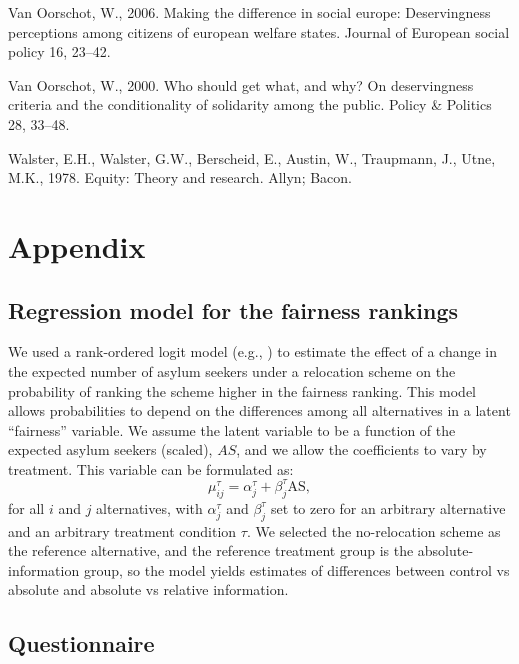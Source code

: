 \documentclass[
  12pt,
  a4paper,
]{article}
\newlength{\cslhangindent}
\newenvironment{CSLReferences}[2] %
 {\begin{list}{}{%
  \setlength{\itemindent}{0pt}
  \setlength{\leftmargin}{0pt}
  \setlength{\parsep}{0pt}
  \ifodd #1
   \setlength{\leftmargin}{\cslhangindent}
   \setlength{\itemindent}{-1\cslhangindent}
  \fi
  \setlength{\itemsep}{#2\baselineskip}}}
 {\end{list}}
\begin{document}
\begin{CSLReferences}{1}{0}
Van Oorschot, W., 2006. Making the difference in social europe: Deservingness perceptions among citizens of european welfare states. Journal of European social policy 16, 23--42.

Van Oorschot, W., 2000. Who should get what, and why? On deservingness criteria and the conditionality of solidarity among the public. Policy \& Politics 28, 33--48.

Walster, E.H., Walster, G.W., Berscheid, E., Austin, W., Traupmann, J., Utne, M.K., 1978. Equity: Theory and research. Allyn; Bacon.

\end{CSLReferences}

\section{Appendix}\label{appendix}

\subsection{Regression model for the fairness rankings}\label{regression-model-for-the-fairness-rankings}

We used a rank-ordered logit model (e.g., ) to estimate the effect of a change in the expected number of asylum seekers under a relocation scheme on the probability of ranking the scheme higher in the fairness ranking. This model allows probabilities to depend on the differences among all alternatives in a latent ``fairness'' variable. We assume the latent variable to be a function of the expected asylum seekers (scaled), \(AS\), and we allow the coefficients to vary by treatment. This variable can be formulated as:
\[
    \mu_{ij}^{\tau} = \alpha_{j}^{\tau} + \beta_{j}^{\tau} \text{AS},
\]
for all \(i\) and \(j\) alternatives, with \(\alpha_{j}^{\tau}\) and \(\beta_{j}^{\tau}\) set to zero for an arbitrary alternative and an arbitrary treatment condition \(\tau\). We selected the no-relocation scheme as the reference alternative, and the reference treatment group is the absolute-information group, so the model yields estimates of differences between control vs absolute and absolute vs relative information.

\subsection{Questionnaire}\label{questionnaire}
\end{document}
